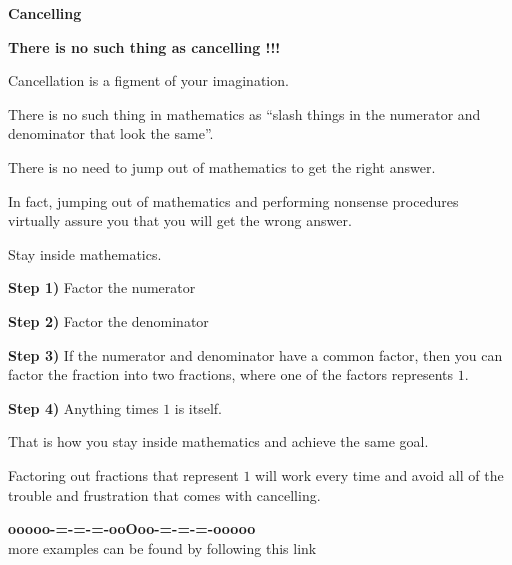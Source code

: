 \documentclass{ximera}
\begin{document}
\begin{warning} \textbf{\textcolor{red!70!black}{Cancelling}}



\begin{center}
\textbf{\textcolor{red!70!black}{There is no such thing as cancelling !!!}}
\end{center}


Cancellation is a figment of your imagination.  

There is no such thing in mathematics as ``slash things in the numerator and denominator that look the same''.

There is no need to jump out of mathematics to get the right answer.

In fact, jumping out of mathematics and performing nonsense procedures virtually assure you that you will get the wrong answer.


Stay inside mathematics.



\textbf{\textcolor{blue!55!black}{Step 1)}}  Factor the numerator

\textbf{\textcolor{blue!55!black}{Step 2)}}  Factor the denominator

\textbf{\textcolor{blue!55!black}{Step 3)}} If the numerator and denominator have a common factor, then you can factor the fraction into two fractions, where one of the factors represents $1$.

\textbf{\textcolor{blue!55!black}{Step 4)}} Anything times $1$ is itself.



That is how you stay inside mathematics and achieve the same goal.

Factoring out fractions that represent $1$ will work every time and avoid all of the trouble and frustration that comes with cancelling.




\end{warning}
























\begin{center}
\textbf{\textcolor{green!50!black}{ooooo-=-=-=-ooOoo-=-=-=-ooooo}} \\

more examples can be found by following this link\\ 

\end{center}
\end{document}
